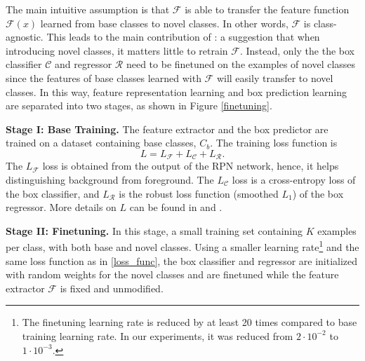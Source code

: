 \documentclass{article}
\begin{document}
The main intuitive assumption is that $\mathcal{F}$ is able to transfer the feature function $\mathcal{F}(x)$ learned from base classes to 
novel classes. In other words, $\mathcal{F}$ is class-agnostic. This leads to the main contribution of 
\cite{wang2020frustratingly}: a suggestion that when introducing novel classes, it matters 
little to retrain $\mathcal{F}$. Instead, only the the box classifier $\mathcal{C}$ and regressor $\mathcal{R}$
need to be finetuned on the examples of novel classes since the features of base classes learned with $\mathcal{F}$ 
will easily transfer to novel classes. In this way, feature representation learning and box 
prediction learning are separated into two stages, as shown in Figure \ref{finetuning}.

\textbf{Stage I: Base Training. } 
The feature  extractor and the box predictor are trained on a dataset containing 
base classes, $C_b$. The training loss function \cite{ren2015faster} is 
\begin{equation}
  L = L_{\mathcal{F}} + L_{\mathcal{C}} + L_{\mathcal{R}}. 
  \label{loss_func}
\end{equation}
The $L_{\mathcal{F}}$ loss is obtained from the output of the RPN network, hence, it helps distinguishing 
background from foreground. The $L_{\mathcal{C}}$ loss is a cross-entropy loss of the box classifier, and 
$L_{\mathcal{R}}$ is the robust loss function (smoothed $L_1$) of the box regressor. More details on $L$ can be
found in \cite{ren2015faster} and \cite{girshick2015fast}. 

\textbf{Stage II: Finetuning. }
In this stage, a small training set containing $K$ examples per class, with both base and novel classes. 
Using a smaller learning rate\footnote{The finetuning learning rate is reduced by at least 20 times compared 
to base training learning rate. In our experiments, it was reduced from $2\cdot10^{-2}$ to $1\cdot10^{-3}$.} 
and the same loss function as in \eqref{loss_func}, the box classifier 
and regressor are initialized with random weights for the novel classes and are finetuned 
while the feature extractor $\mathcal{F}$ is fixed and unmodified. 
\end{document}

